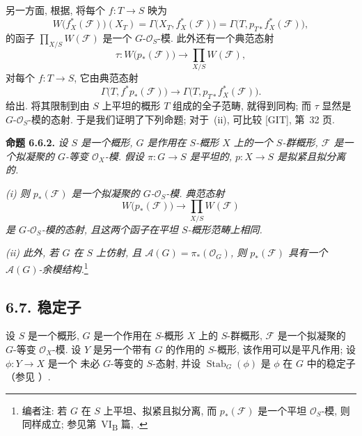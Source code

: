 另一方面, 根据,
将每个 \(f:T\to S\) 映为
\[
  W\bigl(f_X^*(\mathcal F)\bigr)(X_T)
  =\Gamma\bigl(X_T,f_X^*(\mathcal F)\bigr)
  =\Gamma\bigl(T,p_{T*}f_X^*(\mathcal F)\bigr),
\]
的函子 \(\prod_{X/S}W(\mathcal F)\) 是一个
\(G\)-\(\mathcal O_S\)-模. 此外还有一个典范态射
\[
  \tau:W\bigl(p_*(\mathcal F)\bigr)
  \longrightarrow\prod_{X/S}W(\mathcal F),
\]
对每个 \(f:T\to S\), 它由典范态射
\[
  \Gamma\bigl(T,f^*p_*(\mathcal F)\bigr)
  \longrightarrow
  \Gamma\bigl(T,p_{T*}f_X^*(\mathcal F)\bigr).
\]
给出. 将其限制到由 \(S\) 上平坦的概形 \(T\) 组成的全子范畴,
就得到同构; 而 \(\tau\) 显然是 \(G\)-\(\mathcal O_S\)-模的态射.
于是我们证明了下列命题; 对于~(ii), 可比较 [GIT], 第~32 页.

\medskip
\noindent{}\textbf{命题 6.6.2.}
\textit{设 \(S\) 是一个概形, \(G\) 是作用在 \(S\)-概形 \(X\)
上的一个 \(S\)-群概形, \(\mathcal F\) 是一个拟凝聚的 \(G\)-等变
\(\mathcal O_X\)-模. 假设 \(\pi:G\to S\) 是平坦的,
\(p:X\to S\) 是拟紧且拟分离的.}

\textit{(i) 则 \(p_*(\mathcal F)\) 是一个拟凝聚的
\(G\)-\(\mathcal O_S\)-模. 典范态射}
\[
  W\bigl(p_*(\mathcal F)\bigr)
  \longrightarrow\prod_{X/S}W(\mathcal F)
\]
\textit{是 \(G\)-\(\mathcal O_S\)-模的态射, 且这两个函子在平坦
\(S\)-概形范畴上相同.}

\textit{(ii) 此外, 若 \(G\) 在 \(S\) 上仿射, 且
\(\mathscr A(G)=\pi_*(\mathcal O_G)\), 则 \(p_*(\mathcal F)\)
具有一个 \(\mathscr A(G)\)-余模结构.}\footnote{编者注:
若 \(G\) 在 \(S\) 上平坦、拟紧且拟分离, 而 \(p_*(\mathcal F)\)
是一个平坦 \(\mathcal O_S\)-模, 则同样成立;
参见第~VI\textsubscript{B} 篇, .}

\subsection*{6.7. 稳定子}

设 \(S\) 是一个概形, \(G\) 是一个作用在 \(S\)-概形 \(X\)
上的 \(S\)-群概形, \(\mathcal F\) 是一个拟凝聚的 \(G\)-等变
\(\mathcal O_X\)-模. 设 \(Y\) 是另一个带有 \(G\) 的作用的
\(S\)-概形, 该作用可以是平凡作用; 设 \(\phi:Y\to X\) 是一个
未必 \(G\)-等变的 \(S\)-态射, 并设
\(\operatorname{Stab}_G(\phi)\) 是 \(\phi\) 在 \(G\) 中的稳定子
（参见 ）.

